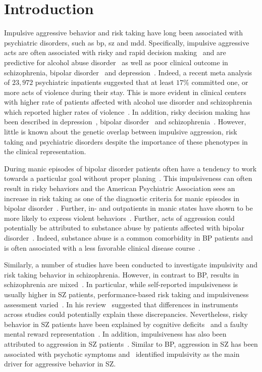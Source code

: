 \section{Introduction}
\label{sec:uk_biobank_psych_introduction}

Impulsive aggressive behavior and risk taking have long been associated with psychiatric disorders, such as \acrfull{bp}, \acrfull{sz} and \acrfull{mdd}.
Specifically, impulsive aggressive acts are often associated with risky and rapid decision making~\cite{Moeller2001} and are predictive for alcohol abuse disorder~\cite{Courtney2012} as well as poor clinical outcome in schizophrenia, bipolar disorder~\cite{Gut-Fayand2001} and depression~\cite{Dutton2013}.
Indeed, a recent meta analysis of $23,972$ psychiatric inpatients suggested that at least $17\%$ committed one, or more acts of violence during their stay.
This is more evident in clinical centers with higher rate of patients affected with alcohol use disorder and schizophrenia which reported higher rates of violence~\cite{Iozzino2015}. 
In addition, risky decision making has been described in depression~\cite{Wilson2010}, bipolar disorder~\cite{Johnson2012} and schizophrenia~\cite{Cheng2012}.
However, little is known about the genetic overlap between impulsive aggression, risk taking and psychiatric disorders despite the importance of these phenotypes in the clinical representation.

During manic episodes of bipolar disorder patients often have a tendency to work towards a particular goal without proper planing~\cite{Johnson2012}.
This impulsiveness can often result in risky behaviors and the American Psychiatric Association sees an increase in risk taking as one of the diagnostic criteria for manic episodes in bipolar disorder~\cite{APA1994,AmericanPsychiatricAssociation2013}.
Further, in- and outpatients in manic states have shown to be more likely to express violent behaviors~\cite{Ballester2012}.
Further, acts of aggression could potentially be attributed to substance abuse by patients affected with bipolar disorder~\cite{Fazel2010}.
Indeed, substance abuse is a common comorbidity in BP patients and is often associated with a less favorable clinical disease course~\cite{Cassidy2001}.

Similarly, a number of studies have been conducted to investigate impulsivity and risk taking behavior in schizophrenia.
However, in contrast to BP, results in schizophrenia are mixed~\cite{Reddy2014}.
In particular, while self-reported impulsiveness is usually higher in SZ patients, performance-based risk taking and impulsiveness assessment varied~\cite{Ouzir2013}.
In his review~\citet{Ouzir2013} suggested that differences in instruments across studies could potentially explain these discrepancies.
Nevertheless, risky behavior in SZ patients have been explained by cognitive deficits~\cite{Cheng2012} and a faulty mental reward representation~\cite{Heerey2011}.
In addition, impulsiveness has also been attributed to aggression in SZ patients~\cite{Hoptman2015}.
Similar to BP, aggression in SZ has been associated with psychotic symptoms and~\citet{Hoptman2015} identified impulsivity as the main driver for aggressive behavior in SZ\@.

